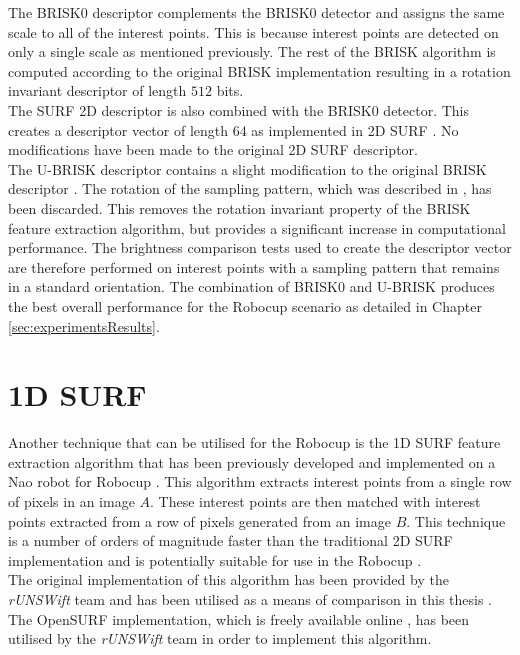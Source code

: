 The BRISK0 descriptor complements the BRISK0 detector and assigns the same scale to all of the interest points. This is because interest points are detected on only a single scale as mentioned previously. The rest of the BRISK algorithm is computed according to the original BRISK implementation resulting in a rotation invariant descriptor of length $512$ bits\citep{Leutenegger2011}.\\

The SURF 2D descriptor is also combined with the BRISK0 detector. This creates a descriptor vector of length $64$ as implemented in 2D SURF \citep{Bay2008}. No modifications have been made to the original 2D SURF descriptor.\\ 

The U-BRISK descriptor contains a slight modification to the original BRISK descriptor \citep{Leutenegger2011}. The rotation of the sampling pattern, which was described in , has been discarded. This removes the rotation invariant property of the BRISK feature extraction algorithm, but provides a significant increase in computational performance. The brightness comparison tests used to create the descriptor vector are therefore performed on interest points with a sampling pattern that remains in a standard orientation. The combination of BRISK0 and U-BRISK produces the best overall performance for the Robocup scenario as detailed in Chapter \ref{sec:experimentsResults}. \\

\section{1D SURF}
\label{sec:1dsurf}
Another technique that can be utilised for the Robocup is the 1D SURF feature extraction algorithm that has been previously developed and implemented on a Nao robot for Robocup \citep{Anderson}. This algorithm extracts interest points from a single row of pixels in an image $A$. These interest points are then matched with interest points extracted from a row of pixels generated from an image $B$. This technique is a number of orders of magnitude faster than the traditional 2D SURF implementation and is potentially suitable for use in the Robocup \citep{Anderson}.\\

The original implementation of this algorithm has been provided by the \textit{rUNSWift} team and has been utilised as a means of comparison in this thesis \citep{Anderson}. The OpenSURF implementation, which is freely available online \citep{opensurf}, has been utilised by the \textit{rUNSWift} team in order to implement this algorithm.\\

